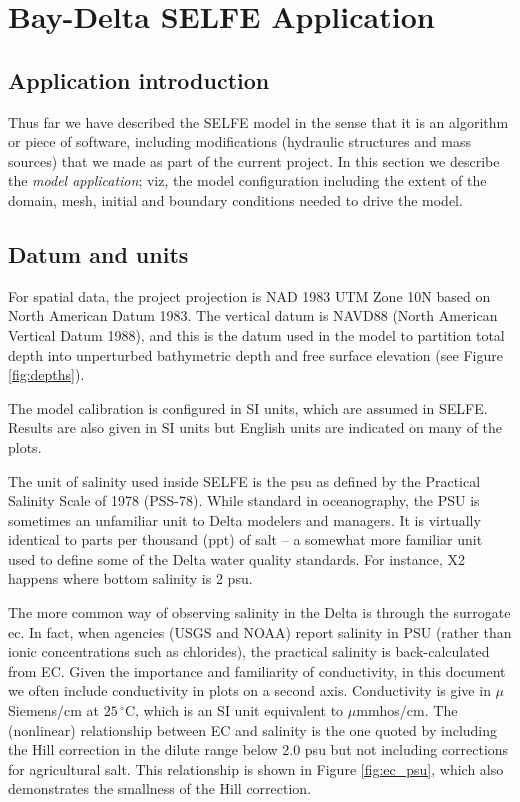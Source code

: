\chapter{Bay-Delta SELFE Application}
\section{Application introduction}
Thus far we have described the SELFE model in the sense that it is an algorithm or piece of software,
including modifications (hydraulic structures and mass sources) that we made as part of the current project.
In this section we describe the {\em model application}; viz, the model configuration including 
the extent of the domain, mesh, initial and boundary conditions needed to drive the model. 

\section{Datum and units}
For spatial data, the project projection is NAD 1983 UTM Zone 10N based on North American Datum 1983.
The vertical datum is NAVD88 (North American Vertical Datum 1988), and this is the datum used in the 
model to partition total depth into unperturbed bathymetric depth and free surface elevation (see 
Figure \ref{fig:depths}).

The model calibration is configured in SI units, which are assumed in SELFE. Results are also 
given in SI units but English units are indicated on many of the plots.

The unit of salinity used inside SELFE is the \gls{psu} as defined by the 
Practical Salinity Scale of 1978 (PSS-78). While standard in oceanography, 
the PSU is sometimes an unfamiliar unit to Delta modelers and managers. 
It is virtually identical to parts per thousand (ppt) of salt -- 
a somewhat more familiar unit used to define some of the Delta water quality standards.
For instance, X2 happens where bottom salinity is 2 psu.

The more common way of observing salinity in the Delta is through the surrogate \gls{ec}.
In fact, when agencies (USGS and NOAA) report salinity in PSU (rather than ionic concentrations
such as chlorides), the practical salinity is back-calculated from EC.
Given the importance and familiarity of conductivity, in this document we
 often include conductivity in plots on a second axis. 
Conductivity is give in $\mu$Siemens/cm at $25\,^{\circ}\mathrm{C}$, which 
is an SI unit equivalent to $\mu$mmhos/cm. The (nonlinear) relationship between EC and
salinity is the one quoted by \cite{suits2002} including the Hill correction in the dilute range 
below 2.0 psu but not including corrections for agricultural salt. This relationship is shown in
Figure \ref{fig:ec_psu}, which also demonstrates the smallness of the Hill correction.   

